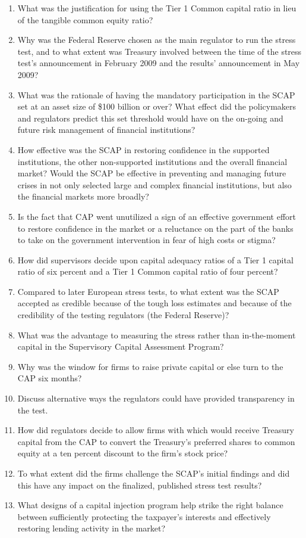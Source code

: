 \documentclass[12pt]{article}
\begin{document}
\begin{enumerate}

\item
  What was the justification for using the Tier 1 Common capital ratio
  in lieu of the tangible common equity ratio?
\item
  Why was the Federal Reserve chosen as the main regulator to run the
  stress test, and to what extent was Treasury involved between the
  time of the stress test's announcement in February 2009 and the
  results' announcement in May 2009?
\item
  What was the rationale of having the mandatory participation in the
  SCAP set at an asset size of \$100 billion or over? What effect did
  the policymakers and regulators predict this set threshold would have
  on the on-going and future risk management of financial institutions?
\item
  How effective was the SCAP in restoring confidence in the supported
  institutions, the other non-supported institutions and the overall
  financial market? Would the SCAP be effective in preventing and
  managing future crises in not only selected large and complex
  financial institutions, but also the financial markets more broadly?
\item
  Is the fact that CAP went unutilized a sign of an effective government
  effort to restore confidence in the market or a reluctance on the part
  of the banks to take on the government intervention in fear of high
  costs or stigma?
\item
  How did supervisors decide upon capital adequacy ratios of a Tier 1
  capital ratio of six percent and a Tier 1 Common capital ratio of four
  percent?
\item
  Compared to later European stress tests, to what extent was the SCAP
  accepted as credible because of the tough loss estimates and because
  of the credibility of the testing regulators (the Federal Reserve)?
\item
  What was the advantage to measuring the stress rather than
  in-the-moment capital in the Supervisory Capital Assessment Program?
\item
  Why was the window for firms to raise private capital or else turn to
  the CAP six months?
\item
  Discuss alternative ways the regulators could have provided
  transparency in the test.
\item
  How did regulators decide to allow firms with which would receive
  Treasury capital from the CAP to convert the Treasury's preferred
  shares to common equity at a ten percent discount to the firm's stock
  price?
\item
  To what extent did the firms challenge the SCAP's initial findings and
  did this have any impact on the finalized, published stress test
  results?
\item
  What designs of a capital injection program help strike the right
  balance between sufficiently protecting the taxpayer's interests and
  effectively restoring lending activity in the market?
\end{enumerate}
\end{document}
